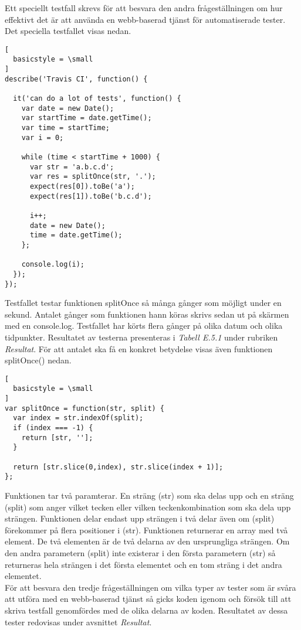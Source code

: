 Ett speciellt testfall skrevs
för att besvara den andra frågeställningen om hur effektivt det är 
att använda en webb-baserad tjänst
för automatiserade tester. Det speciella testfallet visas nedan.

\begin{lstlisting}[
  basicstyle = \small
]
describe('Travis CI', function() {
	
  it('can do a lot of tests', function() {
    var date = new Date();
    var startTime = date.getTime();
    var time = startTime;
    var i = 0;

    while (time < startTime + 1000) {  
      var str = 'a.b.c.d';
      var res = splitOnce(str, '.');
      expect(res[0]).toBe('a');
      expect(res[1]).toBe('b.c.d');

      i++;
      date = new Date(); 
      time = date.getTime();
    };

    console.log(i);
  });
});
\end{lstlisting}

Testfallet testar funktionen splitOnce så många gånger som möjligt
under en sekund. Antalet gånger som funktionen hann köras skrivs
sedan ut på skärmen med en console.log. 
Testfallet har körts flera gånger på olika datum och olika tidpunkter.
Resultatet av testerna presenteras i \emph{Tabell E.5.1}
under rubriken \emph{Resultat}.
För att antalet ska
få en konkret betydelse visas även funktionen splitOnce() nedan.

\begin{lstlisting}[
  basicstyle = \small
]
var splitOnce = function(str, split) {
  var index = str.indexOf(split);
  if (index === -1) {
    return [str, ''];
  }

  return [str.slice(0,index), str.slice(index + 1)];
};
\end{lstlisting}

Funktionen tar två paramterar. En sträng (str) som ska delas upp och 
en sträng (split) som anger vilket tecken eller vilken teckenkombination
som ska dela upp strängen. Funktionen delar endast upp strängen i två delar
även om (split) förekommer på flera positioner i (str). Funktionen returnerar 
en array med två element.
De två elementen är de två delarna av den ursprungliga strängen. Om den andra
parametern (split) inte existerar i den första parametern (str) så returneras
hela strängen i det första elementet och en tom sträng i det andra elementet.\\

För att besvara den tredje frågeställningen om vilka typer av tester som är 
svåra att utföra med en webb-baserad tjänst så gicks koden igenom och 
försök till att skriva testfall genomfördes
med de olika delarna av koden. Resultatet av dessa tester redovisas under 
avsnittet \emph{Resultat}.

